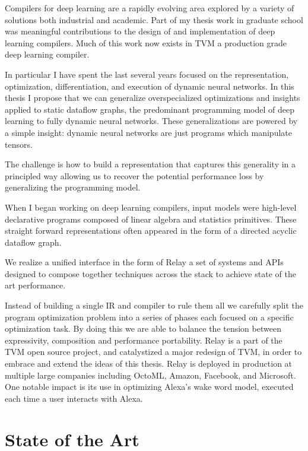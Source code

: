 Compilers for deep learning are a rapidly evolving area explored by a
  variety of solutions both industrial and academic.
Part of my thesis work in graduate school
  was meaningful contributions to the design of and implementation of deep learning compilers.
Much of this work now exists in TVM a production grade deep learning compiler.

In particular I have spent the last several years focused on the
  representation,
  optimization,
  differentiation,
  and execution of dynamic neural networks.
In this thesis I propose that we can generalize overspecialized optimizations
  and insights applied to static dataflow graphs, the predominant programming model
  of deep learning to fully dynamic neural networks.
These generalizations are powered by a simple insight:
  dynamic neural networks are just programs which manipulate tensors.

The challenge is how to build a representation that captures this generality
  in a principled way allowing us to recover the potential performance loss by generalizing
  the programming model.

When I began working on deep learning compilers, input models were high-level
  declarative programs composed of linear algebra and statistics primitives.
These straight forward representations often appeared in the form of
  a directed acyclic dataflow graph.

We realize a unified interface in the form of Relay a set of systems and APIs designed
  to compose together techniques across the stack to achieve state of the art performance.

Instead of building a single IR and compiler to rule them all we carefully split
  the program optimization problem into a series of phases each focused on a specific
  optimization task.
By doing this we are able to balance the tension between expressivity, composition
  and performance portability.
Relay is a part of the TVM open source project, and catalystized a major redesign of
  TVM, in order to embrace and extend the ideas of this thesis.
Relay is deployed in production at multiple large companies including
  OctoML, Amazon, Facebook, and Microsoft.
One notable impact is its use in
  optimizing Alexa’s wake word model, executed each time a user interacts with
  Alexa.

\section{State of the Art}

